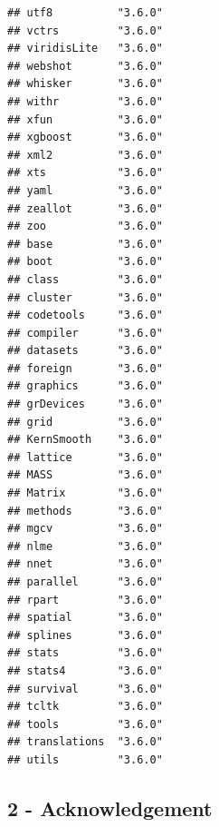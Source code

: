 \documentclass[]{article}
\begin{document}
\begin{verbatim}
## utf8          "3.6.0"
## vctrs         "3.6.0"
## viridisLite   "3.6.0"
## webshot       "3.6.0"
## whisker       "3.6.0"
## withr         "3.6.0"
## xfun          "3.6.0"
## xgboost       "3.6.0"
## xml2          "3.6.0"
## xts           "3.6.0"
## yaml          "3.6.0"
## zeallot       "3.6.0"
## zoo           "3.6.0"
## base          "3.6.0"
## boot          "3.6.0"
## class         "3.6.0"
## cluster       "3.6.0"
## codetools     "3.6.0"
## compiler      "3.6.0"
## datasets      "3.6.0"
## foreign       "3.6.0"
## graphics      "3.6.0"
## grDevices     "3.6.0"
## grid          "3.6.0"
## KernSmooth    "3.6.0"
## lattice       "3.6.0"
## MASS          "3.6.0"
## Matrix        "3.6.0"
## methods       "3.6.0"
## mgcv          "3.6.0"
## nlme          "3.6.0"
## nnet          "3.6.0"
## parallel      "3.6.0"
## rpart         "3.6.0"
## spatial       "3.6.0"
## splines       "3.6.0"
## stats         "3.6.0"
## stats4        "3.6.0"
## survival      "3.6.0"
## tcltk         "3.6.0"
## tools         "3.6.0"
## translations  "3.6.0"
## utils         "3.6.0"
\end{verbatim}

\newpage

\hypertarget{acknowledgement}{%
\subsection{2 - Acknowledgement}\label{acknowledgement}}
\end{document}
